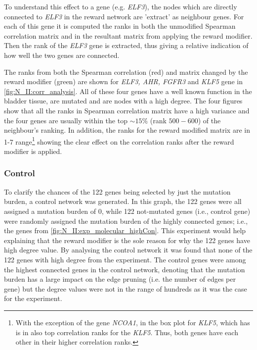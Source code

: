 To understand this effect to a gene (e.g. \textit{ELF3}), the nodes which are directly connected to \textit{ELF3} in the reward network are 'extract' as neighbour genes. For each of this gene it is computed the ranks in both the unmodified Spearman correlation matrix and in the resultant matrix from applying the reward modifier. Then the rank of the \textit{ELF3} gene is extracted, thus giving a relative indication of how well the two genes are connected.

The ranks from both the Spearman correlation (red) and matrix changed  by the reward modifier (green) are shown for \textit{ELF3, AHR, FGFR3} and \textit{KLF5} gene in \cref{fig:N_II:corr_analysis}. All of these four genes have a well known function in the bladder tissue, are mutated and are nodes with a high degree. The four figures show that all the ranks in Spearman correlation matrix have a high variance and the four genes are usually within the top $\sim15\%$ (rank $500-600$) of the neighbour's ranking. In addition, the ranks for the reward modified matrix are in 1-7 range\footnote{With the exception of the gene \textit{NCOA1}, in the box plot for \textit{KLF5}, which has is in also top correlation ranks for the \textit{KLF5}. Thus, both genes have each other in their higher correlation ranks.} showing the clear effect on the correlation ranks after the reward modifier is applied. 

\subsubsection*{Control}

To clarify the chances of the 122 genes being selected by just the mutation burden, a control network was generated. In this graph, the 122 genes were all assigned a mutation burden of 0, while 122 not-mutated genes (i.e., control gene) were randomly assigned the mutation burden of the highly connected genes; i.e., the genes from \cref{fig:N_II:exp_molecular_highCon}. This experiment would help explaining that the reward modifier is the sole reason for why the 122 genes have high degree value. By analysing the control network it was found that none of the 122 genes with high degree from the experiment. The control genes were among the highest connected genes in the control network, denoting that the mutation burden has a large impact on the edge pruning (i.e. the number of edges per gene) but the degree values were not in the range of hundreds as it was the case for the experiment.

